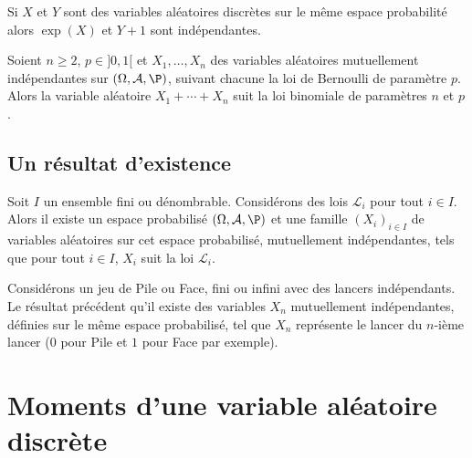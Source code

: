 \documentclass[french,11pt,twoside]{VcCours}
\begin{document}
\begin{Demonstration}{}

\vspace{3cm}
\end{Demonstration}

\begin{Exemple}{} Si $X$ et $Y$ sont des variables aléatoires discrètes sur le même espace probabilité alors $\exp(X)$ et $Y+1$ sont indépendantes.
\end{Exemple}

\begin{Proposition}{} Soient $n \geq 2$, $p \in ]0,1[$ et $X_1, \ldots, X_n$ des variables aléatoires mutuellement indépendantes sur $(\Omega, \mathcal{A}, \P)$, suivant chacune la loi de Bernoulli de paramètre $p$. Alors la variable aléatoire $X_1+ \cdots + X_n$ suit la loi binomiale de paramètres $n$ et $p$.
\end{Proposition}

\begin{Demonstration}{}
\vspace{3cm}
\end{Demonstration}

\subsection{Un résultat d'existence}

\begin{Theoreme}{} Soit $I$ un ensemble fini ou dénombrable. Considérons des lois $\mathcal{L}_i$ pour tout $i \in I$. Alors il existe un espace probabilisé $(\Omega, \mathcal{A}, \P)$ et une famille $(X_i)_{i \in I}$ de variables aléatoires sur cet espace probabilisé, mutuellement indépendantes, tels que pour tout $i \in I$, $X_i$ suit la loi $\mathcal{L}_i$.
\end{Theoreme}

\begin{Exemple}{} Considérons un jeu de Pile ou Face, fini ou infini avec des lancers indépendants. Le résultat précédent qu'il existe des variables $X_n$ mutuellement indépendantes, définies sur le même espace probabilisé, tel que $X_n$ représente le lancer du $n$-ième lancer ($0$ pour Pile et $1$ pour Face par exemple).
\end{Exemple}







\section{Moments d'une variable aléatoire discrète}
\end{document}
